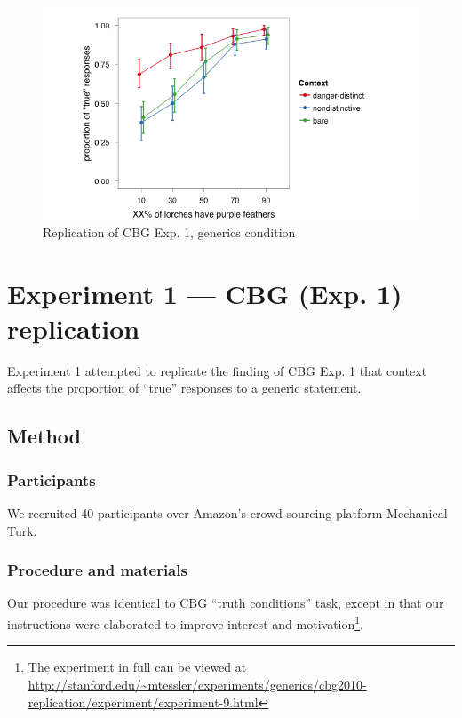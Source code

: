 \documentclass[10pt,letterpaper]{article}
\begin{document}
\begin{figure}
\centering
    \includegraphics[width=\columnwidth]{fig1_replication}
    \caption{Replication of CBG Exp. 1, generics condition}
  \label{fig:replication}
\end{figure}

\section{Experiment 1 --- CBG (Exp. 1) replication}

Experiment 1 attempted to replicate the finding of CBG Exp. 1 that context affects the proportion of ``true'' responses to a generic statement. 

\subsection{Method}

\subsubsection{Participants}

We recruited 40 participants over Amazon's crowd-sourcing platform Mechanical Turk. 

\subsubsection{Procedure and materials}

Our procedure was identical to CBG ``truth conditions'' task, except in that our instructions were elaborated to improve interest and motivation\footnote{The experiment in full can be viewed at \url{http://stanford.edu/~mtessler/experiments/generics/cbg2010-replication/experiment/experiment-9.html}}. 
\end{document}
